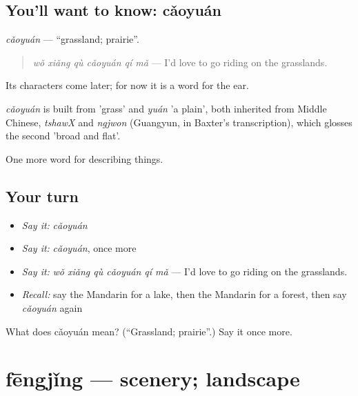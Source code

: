 \subsection*{You'll want to know: cǎoyuán}
\emph{cǎoyuán} — \textquotedblleft{}grassland; prairie\textquotedblright{}.

\begin{quote}
\emph{wǒ xiǎng qù cǎoyuán qí mǎ} — I'd love to go riding on the grasslands.
\end{quote}

Its characters come later; for now it is a word for the ear.

\begin{cousinweb}
\emph{cǎoyuán} is built from  'grass' and \emph{yuán} 'a plain', both inherited from Middle Chinese, \emph{tshawX} and \emph{ngjwon} (Guangyun, in Baxter's transcription), which glosses the second 'broad and flat'.
\end{cousinweb}

\begin{grammarlens}[title={What you've built}]
One more word for describing things.
\end{grammarlens}

\subsection*{Your turn}
\begin{itemize}
\raggedright
  \item \emph{Say it:} \emph{cǎoyuán}
  \item \emph{Say it:} \emph{cǎoyuán}, once more
  \item \emph{Say it:} \emph{wǒ xiǎng qù cǎoyuán qí mǎ} — I'd love to go riding on the grasslands.
  \item \emph{Recall:} say the Mandarin for a lake, then the Mandarin for a forest, then say \emph{cǎoyuán} again
\end{itemize}

\begin{tcolorbox}[breakable,colback=teal!4,colframe=teal!35!black,title={Before you move on}]
What does cǎoyuán mean? (\textquotedblleft{}Grassland; prairie\textquotedblright{}.) Say it once more.
\end{tcolorbox}
\section[fēngjǐng]{fēngjǐng — scenery; landscape}

\label{lesson:ZH-C226-fengjing}



